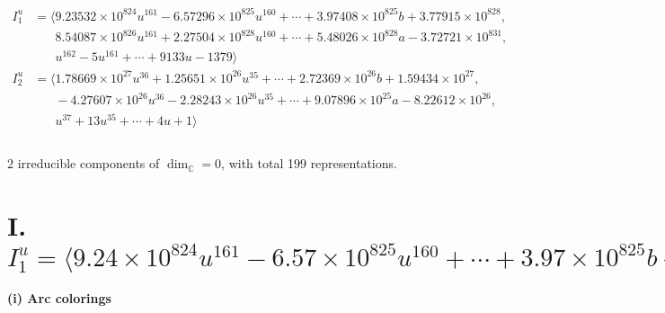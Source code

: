 \documentclass[1p]{elsarticle_modified}
\theoremstyle{definition}
\begin{document}
\begin{align*}
I^u_{1}&=\langle 
9.23532\times10^{824} u^{161}-6.57296\times10^{825} u^{160}+\cdots+3.97408\times10^{825} b+3.77915\times10^{828},\\
\phantom{I^u_{1}}&\phantom{= \langle  }8.54087\times10^{826} u^{161}+2.27504\times10^{828} u^{160}+\cdots+5.48026\times10^{828} a-3.72721\times10^{831},\\
\phantom{I^u_{1}}&\phantom{= \langle  }u^{162}-5 u^{161}+\cdots+9133 u-1379\rangle \\
I^u_{2}&=\langle 
1.78669\times10^{27} u^{36}+1.25651\times10^{26} u^{35}+\cdots+2.72369\times10^{26} b+1.59434\times10^{27},\\
\phantom{I^u_{2}}&\phantom{= \langle  }-4.27607\times10^{26} u^{36}-2.28243\times10^{26} u^{35}+\cdots+9.07896\times10^{25} a-8.22612\times10^{26},\\
\phantom{I^u_{2}}&\phantom{= \langle  }u^{37}+13 u^{35}+\cdots+4 u+1\rangle \\
\\
\end{align*}
\raggedright * 2 irreducible components of $\dim_{\mathbb{C}}=0$, with total 199 representations.\\
\newpage
\renewcommand{\arraystretch}{1}
\centering \section*{I. $I^u_{1}= \langle 9.24\times10^{824} u^{161}-6.57\times10^{825} u^{160}+\cdots+3.97\times10^{825} b+3.78\times10^{828},\;8.54\times10^{826} u^{161}+2.28\times10^{828} u^{160}+\cdots+5.48\times10^{828} a-3.73\times10^{831},\;u^{162}-5 u^{161}+\cdots+9133 u-1379 \rangle$}
\flushleft \textbf{(i) Arc colorings}\\
\end{document}

